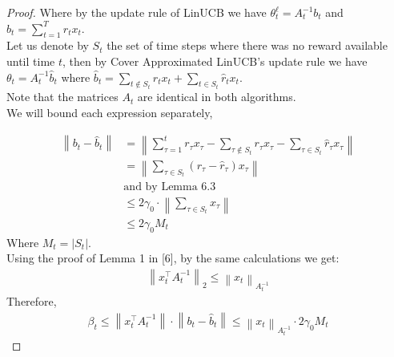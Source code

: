 \documentclass{article}
\newcommand{\norm}[1]{\left\lVert#1\right\rVert}
\begin{document}
\begin{proof}
Where by the update rule of LinUCB we have $\theta^\ell _t = A^{-1} _t b_t $ and $b_t = \sum_{t=1}^T r_t x_t$.\\
Let us denote by $S_t$ the set of time steps where there was no reward available until time $t$, then by Cover Approximated LinUCB's update rule we have $\theta _t = A^{-1} _t \hat{b}_t $ where $\hat{b}_t = \sum_{t \notin S_t} r_t x_t + \sum_{t \in S_t} \hat{r}_t x_t$.\\
Note that the matrices $A_t$ are identical in both algorithms. \\

We will bound each expression separately,

\begin{equation}
    \begin{split}
        \norm{b_t-\hat{b}_t} &= \norm{\sum_{\tau=1}^t r_{\tau} x_{\tau} -  \sum_{\tau \notin S_t} r_{\tau} x_{\tau} - \sum_{\tau \in S_t} \hat{r}_{\tau} x_{\tau}}\\
        &= \norm{\sum_{\tau \in S_t} (r_{\tau}- \hat{r}_{\tau}) x_{\tau}}\\
         &\text{and by Lemma 6.3} \\
        &\leq 2\gamma_0 \cdot \norm{\sum_{\tau \in S_t} x_\tau}\\
        &\leq 2\gamma_0 M_t
    \end{split}
\end{equation}
Where $M_t = |S_t|$.\\

Using the proof of Lemma 1 in [6], by the same calculations we get:
\begin{equation}
    \begin{split}
        \norm{x_t ^\top A^{-1} _t}_2 \leq \norm{x_t}_{A_t^{-1}}
    \end{split}
\end{equation}
Therefore,
\begin{equation}
    \begin{split}
        \beta_t  \leq \norm{x_t ^\top A^{-1} _t}\cdot\norm{b_t-\hat{b}_t} \leq \norm{x_t}_{A_t^{-1}} \cdot  2\gamma_0 M_t
    \end{split}
\end{equation}


\end{proof}
\end{document}
